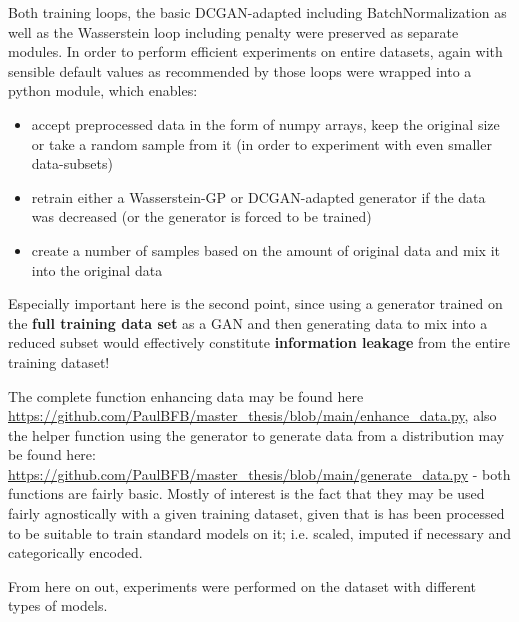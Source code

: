 Both training loops, the basic DCGAN-adapted including BatchNormalization as well as the Wasserstein loop including penalty were preserved as separate modules. 
In order to perform efficient experiments on entire datasets, again with sensible default values as recommended by \cite{buitinck2013api} those loops were wrapped into a python module, which enables:

\begin{itemize}
	\item accept preprocessed data in the form of numpy arrays, keep the original size or take a random sample from it (in order to experiment with even smaller data-subsets)
	\item retrain either a Wasserstein-GP or DCGAN-adapted generator if the data was decreased (or the generator is forced to be trained)
	\item create a number of samples based on the amount of original data and mix it into the original data
\end{itemize}

Especially important here is the second point, since using a generator trained on the \textbf{full training data set} as a \ac{GAN} and then generating data to mix into a reduced subset 
would effectively constitute \textbf{information leakage} from the entire training dataset!

The complete function enhancing data may be found here \url{https://github.com/PaulBFB/master_thesis/blob/main/enhance_data.py}, also the helper function using the generator to generate data from a distribution may be found here: \url{https://github.com/PaulBFB/master_thesis/blob/main/generate_data.py} - both functions are fairly basic. 
Mostly of interest is the fact that they may be used fairly agnostically with a given training dataset, given that is has been processed to be suitable to train standard models on it; i.e. scaled, imputed if necessary and categorically encoded.

From here on out, experiments were performed on the dataset with different types of models.

